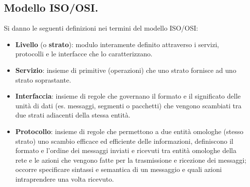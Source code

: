 \documentclass[11pt, italian, openany]{book}
\begin{document}
\begin{sloppypar}
\subsection*{Modello ISO/OSI.}
Si danno le seguenti definizioni nei termini del modello ISO/OSI:
\begin{itemize}[topsep=0pt]
	\itemsep-0.3em
	\item \textbf{Livello} (o \textbf{strato}): modulo interamente definito attraverso i servizi, protocolli e le interfacce che lo caratterizzano.
	\item \textbf{Servizio}: insieme di primitive (operazioni) che uno strato fornisce ad uno strato soprastante.
	\item \textbf{Interfaccia}: insieme di regole che governano il formato e il significato delle unit\`a di dati (es. messaggi, segmenti o
	pacchetti) che vengono scambiati tra due strati adiacenti della stessa entit\`a.
	\item \textbf{Protocollo}: insieme di regole che permettono a due entit\`a omologhe (stesso strato) uno scambio efficace ed efficiente delle
	informazioni, definiscono il formato e l’ordine dei messaggi inviati e ricevuti tra entit\`a omologhe della rete e le azioni che vengono
	fatte per la trasmissione e ricezione dei messaggi; occorre specificare sintassi e semantica di un messaggio e quali azioni intraprendere
	una volta ricevuto.
\end{itemize}


\end{sloppypar}
\end{document}
